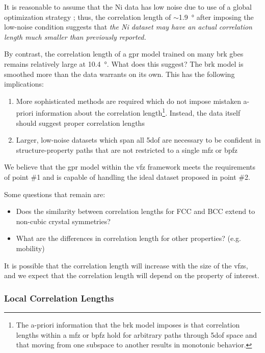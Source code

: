 \documentclass[final,twocolumn,12pt]{elsarticle}
\begin{document}
	It is reasonable to assume that the Ni data has low noise due to use of a global optimization strategy \cite{olmstedSurveyComputedGrain2009}; thus, the correlation length of $\sim$\SI{1.9}{\degree} after imposing the low-noise condition suggests that \textit{the Ni dataset may have an actual correlation length much smaller than previously reported.}
	
	By contrast, the correlation length of a \gls{gpr} model trained on many \gls{brk} \glspl{gbe} remains relatively large at \SI{10.4}{\degree}. What does this suggest? The \gls{brk} model is smoothed more than the data warrants on its own. This has the following implications:
	\begin{enumerate}
	    \item More sophisticated methods are required which do not impose mistaken a-priori information about the correlation length\footnote{The a-priori information that the \gls{brk} model imposes is that correlation lengths within a \gls{mfz} or \gls{bpfz} hold for arbitrary paths through \gls{5dof} space and that moving from one subspace to another results in monotonic behavior. }. Instead, the data itself should suggest proper correlation lengths
	    \item Larger, low-noise datasets which span all \gls{5dof} are necessary to be confident in structure-property paths that are not restricted to a single \gls{mfz} or \gls{bpfz}
	\end{enumerate}
	
	We believe that the \gls{gpr} model within the \gls{vfz} framework meets the requirements of point \#1 and is capable of handling the ideal dataset proposed in point \#2.
	
	Some questions that remain are:
	\begin{itemize}
	    \item Does the similarity between correlation lengths for FCC and BCC extend to non-cubic crystal symmetries?
	    \item What are the differences in correlation length for other properties? (e.g. mobility)
	\end{itemize}
	It is possible that the correlation length will increase with the size of the \glspl{vfz}, and we expect that the correlation length will depend on the property of interest.
	
    \subsubsection{Local Correlation Lengths} \label{sec:results:correlation:local}
    
\end{document}
